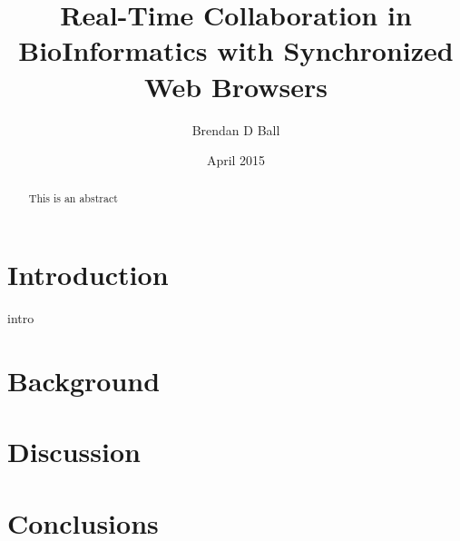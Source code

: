 \documentclass{article}
\begin{document}
\title{Real-Time Collaboration in BioInformatics with Synchronized Web Browsers} %
\author{Brendan D Ball}
\date{April 2015}

\maketitle
\begin{abstract}
This is an abstract
\end{abstract}

\section{Introduction}
intro

\section{Background}

\section{Discussion}

\section{Conclusions}


\nocite{*}
\printbibliography
\end{document}

